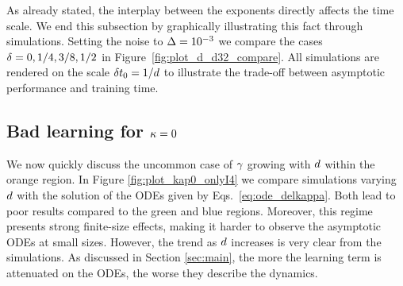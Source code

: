 \documentclass[10pt]{article}
\begin{document}
As already stated, the interplay between the exponents directly affects the time scale. We end this subsection by graphically illustrating this fact through simulations. Setting the noise to $\Delta = 10^{-3}$ we compare the cases $\delta =  0, 1/4, 3/8, 1/2$ in Figure~\ref{fig:plot_d_d32_compare}. All simulations are rendered on the scale $ \delta t_0 = 1 / d  $ to illustrate the trade-off between asymptotic performance and training time. 


\subsection{Bad learning for \texorpdfstring{$\kappa = 0$}{K=0}}
We now quickly discuss the uncommon case of $\gamma$ growing with $d$ within the orange region. In Figure \ref{fig:plot_kap0_onlyI4} we compare simulations varying $d$ with the solution of the ODEs given by Eqs.~\eqref{eq:ode_delkappa}. Both lead to poor results compared to the green and blue regions. Moreover, this regime presents strong finite-size effects, making it harder to observe the asymptotic ODEs at small sizes. However, the trend as $d$ increases is very clear from the simulations. As discussed in Section \ref{sec:main}, the more the learning term is attenuated on the ODEs, the worse they describe the dynamics.

\end{document}
